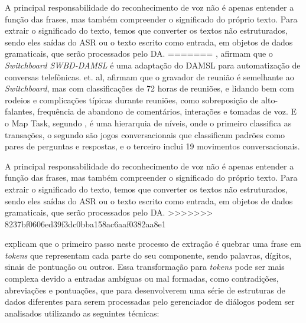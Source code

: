 \documentclass[
	12pt,				%
	oneside,
	a4paper,			%
	english,			%
	french,				%
	spanish,			%
	brazil				%
	]{abntex2}
\begin{document}
A principal responsabilidade do reconhecimento de voz não é apenas entender a função das frases, mas também compreender o significado do próprio texto.
Para extrair o significado do texto, temos que converter os textos não estruturados, sendo eles saídas do ASR ou o texto escrito como entrada, em objetos de dados gramaticais, que serão processados pelo DA.\cite{conversational-interface}
=======
\textcite{dasml-switchboard}, afirmam que o \emph{Switchboard SWBD-DAMSL} é uma adaptação do DAMSL para automatização de conversas telefônicas. \textcite{shriberg-etal-2004-icsi} et. al, afirmam que o gravador de reunião é semelhante ao \emph{Switchboard}, mas com classificações de 72 horas de reuniões, e lidando bem com rodeios e complicações típicas durante reuniões, como sobreposição de alto-falantes, frequência de abandono de comentários, interações e tomadas de voz. E o Map Task, segundo \textcite{map-task}, é uma hierarquia de níveis, onde o primeiro classifica as transações, o segundo são jogos conversacionais que classificam padrões como pares de perguntas e respostas, e o terceiro inclui 19 movimentos conversacionais.

A principal responsabilidade do reconhecimento de voz não é apenas entender a função das frases, mas também compreender o significado do próprio texto.
Para extrair o significado do texto, temos que converter os textos não estruturados, sendo eles saídas do ASR ou o texto escrito como entrada, em objetos de dados gramaticais, que serão processados pelo DA. \cite{conversational-interface}
>>>>>>> 8237bf0606ed39f3dc0bba158ac6aaf0382aa8e1

\textcite{conversational-interface} explicam que o primeiro passo neste processo de extração é quebrar uma frase em \emph{tokens} que representam cada parte do seu componente, sendo palavras, dígitos, sinais de pontuação ou outros. Essa transformação para \emph{tokens} pode ser mais complexa devido a entradas ambíguas ou mal formadas, como contradições, abreviações e pontuações, que para desenvolverem uma série de estruturas de dados diferentes para serem processadas pelo gerenciador de diálogos podem ser analisados utilizando as seguintes técnicas:
\end{document}
